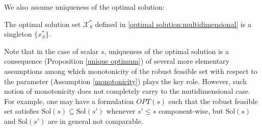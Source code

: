 \documentclass[mnsc,blindrev]{informs4} %
\begin{document}
We also assume uniqueness of the optimal solution:
\begin{assumption}\label{unique optimal solution:multivariate}
The optimal solution set $\mathcal X_S^*$ defined in \eqref{optimal solution:multidimensional} is a singleton $\{x_S^*\}$.
\end{assumption}
Note that in the case of scalar $s$, uniqueness of the optimal solution is a consequence (Proposition \ref{unique optimum}) of several more elementary assumptions among which monotonicity of the robust feasible set with respect to the parameter (Assumption \ref{monotonicity}) plays the key role. However, such notion of monotonicity does not completely carry to the mutidimensional case. For example, one may have a formulation $OPT(s)$ such that the robust feasible set satisfies $\mathrm{Sol}(s)\subseteq \mathrm{Sol}(s')$ whenever $s'\leq s$ component-wise, but $\mathrm{Sol}(s)$ and $\mathrm{Sol}(s')$ are in general not comparable.
\end{document}
